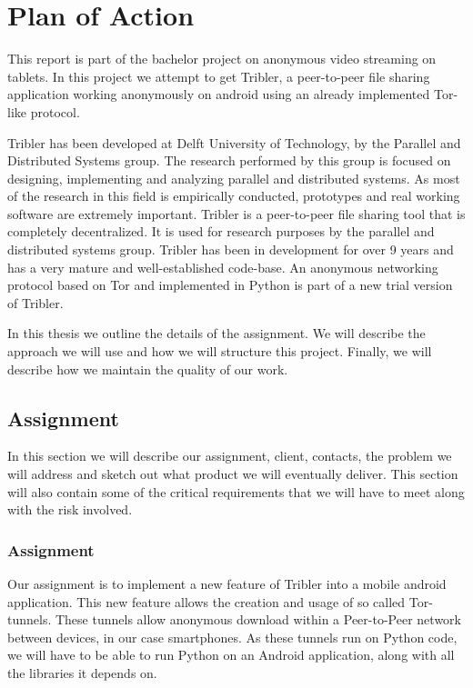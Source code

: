 \chapter{Plan of Action}

This report is part of the bachelor project on anonymous video streaming on tablets. In this project we attempt to get Tribler, a peer-to-peer file sharing application working anonymously on android using an already implemented Tor-like protocol.

Tribler has been developed at Delft University of Technology, by the Parallel and Distributed Systems group. The research performed by this group is focused on designing, implementing and analyzing parallel and distributed systems. As most of the research in this field is empirically conducted, prototypes and real working software are extremely important. Tribler is a peer-to-peer file sharing tool that is completely decentralized. It is used for research purposes by the parallel and distributed systems group. Tribler has been in development for over 9 years and has a very mature and well-established code-base. An anonymous networking protocol based on Tor and implemented in Python is part of a new trial version of Tribler.

In this thesis we outline the details of the assignment. We will describe the approach we will use and how we will structure this project. Finally, we will describe how we maintain the quality of our work.

\section{Assignment}
In this section we will describe our assignment, client, contacts, the problem we will address and sketch out what product we will eventually deliver. This section will also contain some of the critical requirements that we will have to meet along with the risk involved.

\subsection{Assignment}
Our assignment is to implement a new feature of Tribler into a mobile android application. This new feature allows the creation and usage of so called Tor-tunnels. These tunnels allow anonymous download within a Peer-to-Peer network between devices, in our case smartphones.
As these tunnels run on Python code, we will have to be able to run Python on an Android application, along with all the libraries it depends on.

